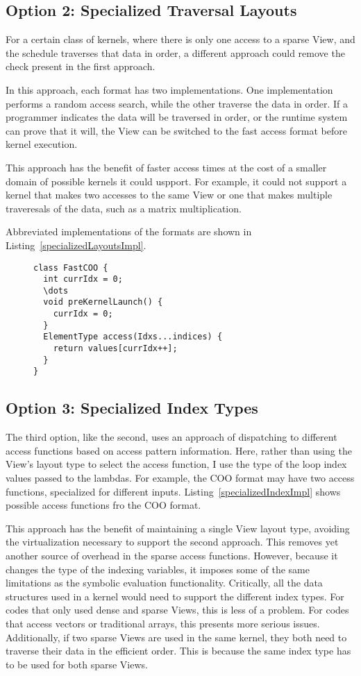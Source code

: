 \subsection{Option 2: Specialized Traversal Layouts}
For a certain class of kernels, where there is only one access to a sparse View, and the schedule traverses that data in order, a different approach could remove the check present in the first approach.

In this approach, each format has two implementations. 
One implementation performs a random access search, while the other traverse the data in order. 
If a programmer indicates the data will be traversed in order, or the runtime system can prove that it will, the View can be switched to the fast access format before kernel execution.

This approach has the benefit of faster access times at the cost of a smaller domain of possible kernels it could uspport. 
For example, it could not support a kernel that makes two accesses to the same View or one that makes multiple traveresals of the data, such as a matrix multiplication.

Abbreviated implementations of the formats are shown in Listing~\ref{specializedLayoutsImpl}.
\begin{figure}
\begin{lstlisting}[caption={Abbreviated format implementation for the Specialized Traversal Layout approach.},label=specializedLayoutsImpl]
class FastCOO {
  int currIdx = 0;
  \dots
  void preKernelLaunch() {
    currIdx = 0;
  }
  ElementType access(Idxs...indices) {
    return values[currIdx++];
  }
}
\end{lstlisting}
\end{figure}

\subsection{Option 3: Specialized Index Types}
The third option, like the second, uses an approach of dispatching to different access functions based on access pattern information.
Here, rather than using the View's layout type to select the access function, I use the type of the loop index values passed to the lambdas.
For example, the COO format may have two access functions, specialized for different inputs.
Listing~\ref{specializedIndexImpl} shows possible access functions fro the COO format.

This approach has the benefit of maintaining a single View layout type, avoiding the virtualization necessary to support the second approach.
This removes yet another source of overhead in the sparse access functions.
However, because it changes the type of the indexing variables, it imposes some of the same limitations as the symbolic evaluation functionality. 
Critically, all the data structures used in a kernel would need to support the different index types. 
For codes that only used dense and sparse Views, this is less of a problem.
For codes that access vectors or traditional arrays, this presents more serious issues.
Additionally, if two sparse Views are used in the same kernel, they both need to traverse their data in the efficient order.
This is because the same index type has to be used for both sparse Views.


